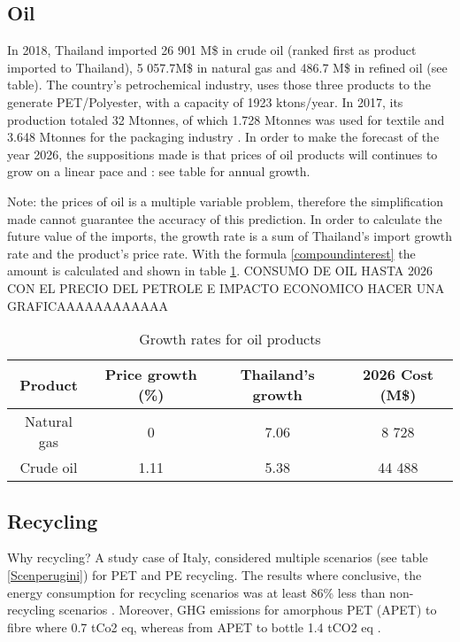 \documentclass[twoside,a4paper,12pt]{report}
\begin{document}
\subsection{Oil}
In 2018, Thailand imported  26 901 M\$ in crude oil (ranked first as product imported to Thailand), 5 057.7M\$ in natural gas and 486.7 M\$ in refined oil (see table).%
The country's petrochemical industry, uses those three products to the generate PET/Polyester, with a capacity of 1923 ktons/year\cite{PTITpetrochem2018}. In 2017, its production totaled 32 Mtonnes, of which 1.728 Mtonnes was used for textile and 3.648 Mtonnes for the packaging industry \cite{KrungsriPetrochem2018}.
In order to make the forecast of the year 2026, the suppositions made is that prices of oil products will continues to grow on a linear pace and : see table for annual growth. 

Note: the prices of oil is a multiple variable problem, therefore the simplification made cannot guarantee the accuracy of this prediction.
In order to calculate the future value of the imports, the growth rate is a sum of Thailand's import growth rate and the product's price rate. With the formula \ref{compoundinterest} the amount is calculated and shown in table \ref{growthrateoilprod}.
CONSUMO DE OIL HASTA 2026 CON EL PRECIO DEL PETROLE E IMPACTO ECONOMICO
 HACER UNA GRAFICAAAAAAAAAAAA
 
 
\begin{table}
\centering
 \begin{tabular}{||c c c c||} 
 \hline
 Product & Price growth (\%) & Thailand's growth & 2026 Cost (M\$) \\  [0.5ex] 
 \hline\hline
 Natural gas & 0 & 7.06 \cite{Tradereport2018} & 8 728  \\ 
 \hline
 Crude oil & 1.11 & 5.38 \cite{Tradereport2018} & 44 488  \\
 \hline
\end{tabular}
\label{growthrateoilprod}
\caption{Growth rates for oil products}
\end{table}

\subsection{Recycling}
Why recycling? A study case of Italy, considered multiple scenarios (see table \ref{Scenperugini}) for PET and PE recycling. The results where conclusive, the energy consumption for recycling scenarios was at least 86\% less than non- recycling scenarios \cite{Perugini2004}. Moreover, GHG emissions for amorphous PET (APET) to  fibre where 0.7 tCo2 eq, whereas from APET to bottle 1.4 tCO2 eq \cite{Shen2011}. 
\end{document}
